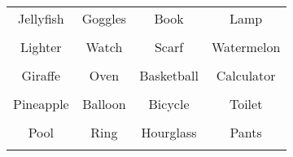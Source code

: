 \documentclass[12pt,a4paper]{article}
\begin{document}
\thispagestyle{empty}
\begin{table}[]
\centering
\Huge
\begin{tabular}{cccc}
 Jellyfish& Goggles& Book& Lamp\\  & & & \\
 Lighter& Watch& Scarf& Watermelon\\  & & & \\
 Giraffe& Oven& Basketball& Calculator\\  & & & \\
 Pineapple& Balloon& Bicycle& Toilet\\  & & & \\
 Pool& Ring& Hourglass& Pants\\  & & & \\
\end{tabular}
\end{table}
\end{document}
